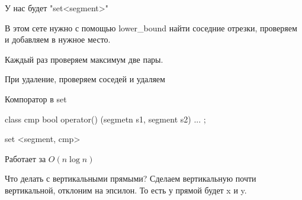 У нас будет \cpp"set<segment>"

В этом сете нужно с помощью lower\_bound найти соседние отрезки, проверяем и добавляем в нужное место.

Каждый раз проверяем максимум две пары.

При удаление, проверяем соседей и удаляем 

Компоратор в set

\begin{cppcode}

class cmp{ 
    bool operator() (segmetn s1, segment s2) {
        ...
    }
};

set <segment, cmp>
\end{cppcode}

Работает за $O(n \log n)$

Что делать с вертикальными прямыми? Сделаем вертикальную почти вертикальной, отклоним на эпсилон. То есть у прямой будет x и y.
